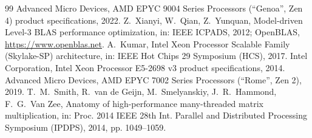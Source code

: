 \documentclass[preprint,12pt]{elsarticle}
\numberwithin{equation}{section}
\begin{document}
\begin{thebibliography}{99}
 Advanced Micro Devices, AMD EPYC 9004 Series Processors (``Genoa'', Zen 4) product specifications, 2022.
 Z.~Xianyi, W.~Qian, Z.~Yunquan, Model-driven Level-3 BLAS performance optimization, in: IEEE ICPADS, 2012; OpenBLAS, \url{https://www.openblas.net}.
 A.~Kumar, Intel Xeon Processor Scalable Family (Skylake-SP) architecture, in: IEEE Hot Chips 29 Symposium (HCS), 2017.
 Intel Corporation, Intel Xeon Processor E5-2698 v3 product specifications, 2014.
 Advanced Micro Devices, AMD EPYC 7002 Series Processors (``Rome'', Zen 2), 2019.
 T.~M.~Smith, R.~van de Geijn, M.~Smelyanskiy, J.~R.~Hammond, F.~G.~Van Zee, Anatomy of high-performance many-threaded matrix multiplication, in: Proc. 2014 IEEE 28th Int. Parallel and Distributed Processing Symposium (IPDPS), 2014, pp. 1049--1059.
\end{thebibliography}
\end{document}
